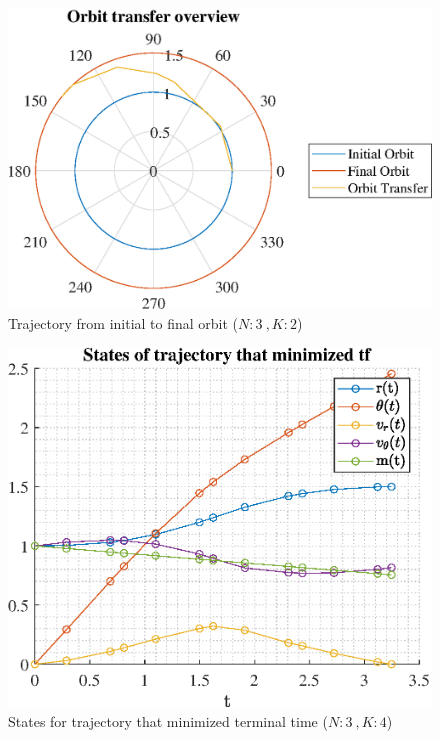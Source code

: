 \documentclass[]{article}
\begin{document}
	\begin{figure}
		\centering
		\includegraphics[scale=0.75]{orbit_N3_K2_C3_tf.eps}
		\caption{Trajectory from initial to final orbit (\(N:3\ , K:2\))}
		\label{fig:orbit_N3_K2_C3_tf}
	\end{figure}
	\begin{figure}
		\centering
		\includegraphics[scale=0.75]{states_N3_K4_C3_tf.eps}
		\caption{States for trajectory that minimized terminal time (\(N:3\ , K:4\))}
		\label{fig:states_N3_K4_C3_tf}
	\end{figure}
\end{document}
